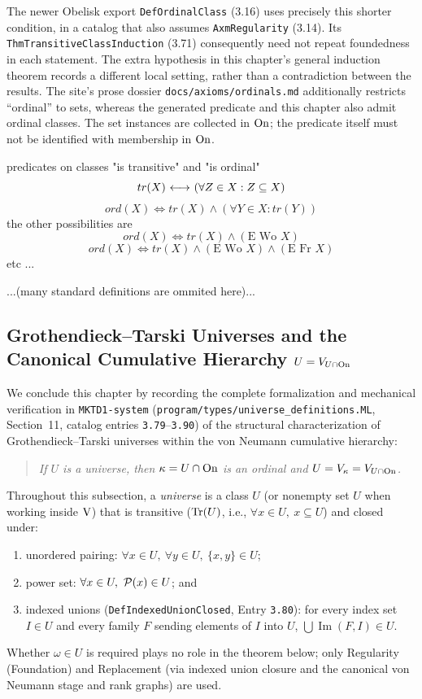 The newer Obelisk export \texttt{DefOrdinalClass} (3.16) uses precisely
this shorter condition, in a catalog that also assumes
\texttt{AxmRegularity} (3.14). Its \texttt{ThmTransitiveClassInduction}
(3.71) consequently need not repeat foundedness in each statement.
The extra hypothesis in this chapter's general induction theorem records
a different local setting, rather than a contradiction between the results.
The site's prose dossier \texttt{docs/axioms/ordinals.md} additionally
restricts ``ordinal'' to sets, whereas the generated predicate and this
chapter also admit ordinal classes. The set instances are collected in
$\mathrm{On}$; the predicate itself must not be identified with membership in $\mathrm{On}$.
\begin{definition} predicates on classes "is transitive" and "is ordinal"
\[
tr(X) {\ \longleftrightarrow\ } (\forall Z\in X: Z\subseteq X)
\]
\[
ord(X) \iff tr(X)\land (\forall Y\in X: tr(Y))
\]
the other possibilities are
\[
ord(X) \iff tr(X)\land (\mbox{E Wo }X)
\]
\[
ord(X) \iff tr(X)\land (\mbox{E Wo }X)\land (\mbox{E Fr }X)
\]
etc ...
\end{definition}

...(many standard definitions are ommited here)...
\fi

\subsection{Grothendieck--Tarski Universes and the Canonical Cumulative Hierarchy $U = V_{U \cap \mathrm{On}}$}

We conclude this chapter by recording the complete formalization and mechanical verification in \texttt{MKTD1-system} (\texttt{program/types/universe\_definitions.ML}, Section~11, catalog entries \texttt{3.79}--\texttt{3.90}) of the structural characterization of Grothendieck--Tarski universes within the von Neumann cumulative hierarchy:
\begin{quote}
\emph{If $U$ is a universe, then $\kappa = U \cap \mathrm{On}$ is an ordinal and $U = V_\kappa = V_{U \cap \mathrm{On}}$.}
\end{quote}

Throughout this subsection, a \emph{universe} is a class $U$ (or nonempty set $U$ when working inside $\mathrm{V}$) that is transitive (${\textrm{Tr}}(U)$, i.e., $\forall x \in U,\ x \subseteq U$) and closed under:
\begin{enumerate}
\item[(i)] unordered pairing: $\forall x \in U,\ \forall y \in U,\ \{x, y\} \in U$;
\item[(ii)] power set: $\forall x \in U,\ \mathcal{P}(x) \in U$; and
\item[(iii)] indexed unions (\texttt{DefIndexedUnionClosed}, Entry \texttt{3.80}): for every index set $I \in U$ and every family $F$ sending elements of $I$ into $U$, $\bigcup\operatorname{Im}(F, I) \in U$.
\end{enumerate}
Whether $\omega \in U$ is required plays no role in the theorem below; only Regularity (Foundation) and Replacement (via indexed union closure and the canonical von Neumann stage and rank graphs) are used.

